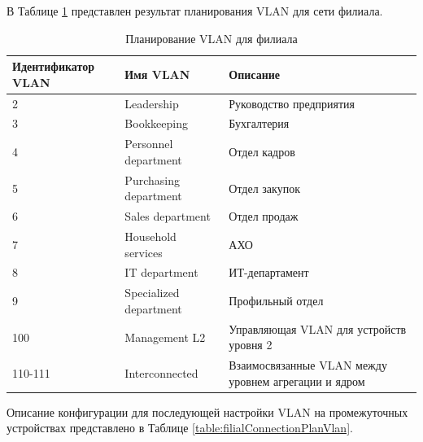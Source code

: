 \documentclass[14pt, a4paper]{extarticle}
\numberwithin{equation}{section}
\begin{document}
В Таблице \ref{table:filialVlan} представлен результат планирования VLAN для сети филиала.
\begin{table}[H]
\centering
\small
\caption{Планирование VLAN для филиала}
\label{table:filialVlan}
\begin{tabular}{|l|l|m{6cm}|}
\hline
\textbf{Идентификатор VLAN} & \textbf{Имя VLAN} & \textbf{Описание} \\
\hline
2 & Leadership & Руководство предприятия \\
\hline
3 & Bookkeeping & Бухгалтерия \\
\hline
4 & Personnel department & Отдел кадров \\
\hline 
5 & Purchasing department & Отдел закупок \\
\hline 
6 & Sales department & Отдел продаж \\
\hline 
7 & Household services & АХО \\
\hline 
8 & IT department & ИТ-департамент \\
\hline
9 & Specialized department & Профильный отдел \\
\hline
100 & Management L2 & Управляющая VLAN для устройств уровня 2 \\
\hline
110-111 & Interconnected & Взаимосвязанные VLAN между уровнем агрегации и ядром \\
\hline
\end{tabular}
\end{table}


Описание конфигурации для последующей настройки VLAN на промежуточных устройствах
представлено в Таблице \ref{table:filialConnectionPlanVlan}.
\end{document}

